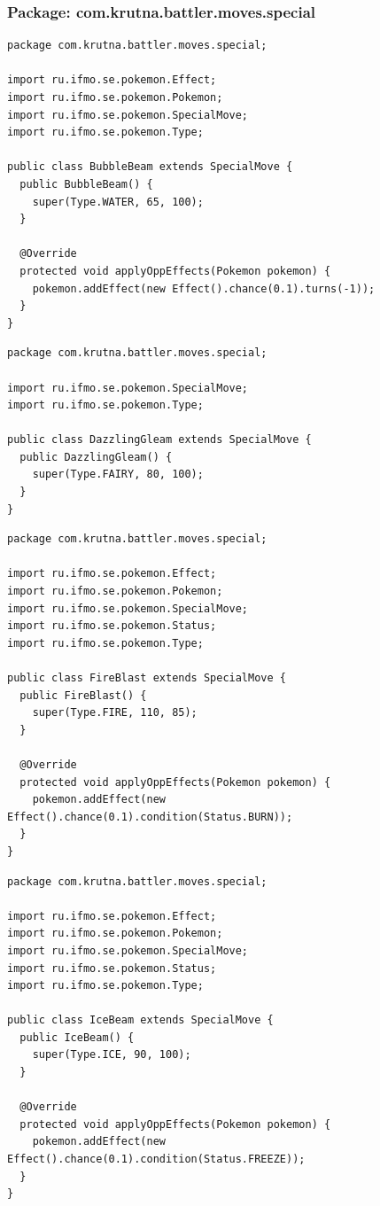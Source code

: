 \documentclass[11pt]{article}
\begin{document}
\subsubsection{Package: com.krutna.battler.moves.special}
\label{sec:orgea242f2}
\begin{lstlisting}
package com.krutna.battler.moves.special;

import ru.ifmo.se.pokemon.Effect;
import ru.ifmo.se.pokemon.Pokemon;
import ru.ifmo.se.pokemon.SpecialMove;
import ru.ifmo.se.pokemon.Type;

public class BubbleBeam extends SpecialMove {
  public BubbleBeam() {
    super(Type.WATER, 65, 100);
  }

  @Override
  protected void applyOppEffects(Pokemon pokemon) {
    pokemon.addEffect(new Effect().chance(0.1).turns(-1));
  }
}
\end{lstlisting}
\begin{lstlisting}
package com.krutna.battler.moves.special;

import ru.ifmo.se.pokemon.SpecialMove;
import ru.ifmo.se.pokemon.Type;

public class DazzlingGleam extends SpecialMove {
  public DazzlingGleam() {
    super(Type.FAIRY, 80, 100);
  }
}
\end{lstlisting}
\begin{lstlisting}
package com.krutna.battler.moves.special;

import ru.ifmo.se.pokemon.Effect;
import ru.ifmo.se.pokemon.Pokemon;
import ru.ifmo.se.pokemon.SpecialMove;
import ru.ifmo.se.pokemon.Status;
import ru.ifmo.se.pokemon.Type;

public class FireBlast extends SpecialMove {
  public FireBlast() {
    super(Type.FIRE, 110, 85);
  }

  @Override
  protected void applyOppEffects(Pokemon pokemon) {
    pokemon.addEffect(new Effect().chance(0.1).condition(Status.BURN));
  }
}
\end{lstlisting}
\begin{lstlisting}
package com.krutna.battler.moves.special;

import ru.ifmo.se.pokemon.Effect;
import ru.ifmo.se.pokemon.Pokemon;
import ru.ifmo.se.pokemon.SpecialMove;
import ru.ifmo.se.pokemon.Status;
import ru.ifmo.se.pokemon.Type;

public class IceBeam extends SpecialMove {
  public IceBeam() {
    super(Type.ICE, 90, 100);
  }

  @Override
  protected void applyOppEffects(Pokemon pokemon) {
    pokemon.addEffect(new Effect().chance(0.1).condition(Status.FREEZE));
  }
}
\end{lstlisting}
\end{document}
